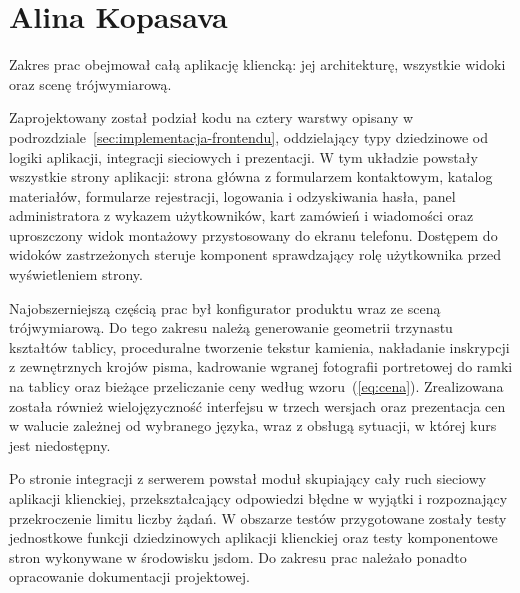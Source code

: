 \section{Alina Kopasava}
\label{sec:wklad-kopasava}

Zakres prac obejmował całą aplikację kliencką: jej architekturę, wszystkie widoki oraz scenę trójwymiarową.

Zaprojektowany został podział kodu na cztery warstwy opisany w podrozdziale~\ref{sec:implementacja-frontendu}, oddzielający typy dziedzinowe od logiki aplikacji, integracji sieciowych i prezentacji. W tym układzie powstały wszystkie strony aplikacji: strona główna z formularzem kontaktowym, katalog materiałów, formularze rejestracji, logowania i odzyskiwania hasła, panel administratora z wykazem użytkowników, kart zamówień i wiadomości oraz uproszczony widok montażowy przystosowany do ekranu telefonu. Dostępem do widoków zastrzeżonych steruje komponent sprawdzający rolę użytkownika przed wyświetleniem strony.

Najobszerniejszą częścią prac był konfigurator produktu wraz ze sceną trójwymiarową. Do tego zakresu należą generowanie geometrii trzynastu kształtów tablicy, proceduralne tworzenie tekstur kamienia, nakładanie inskrypcji z zewnętrznych krojów pisma, kadrowanie wgranej fotografii portretowej do ramki na tablicy oraz bieżące przeliczanie ceny według wzoru~(\ref{eq:cena}). Zrealizowana została również wielojęzyczność interfejsu w trzech wersjach oraz prezentacja cen w walucie zależnej od wybranego języka, wraz z obsługą sytuacji, w której kurs jest niedostępny.

Po stronie integracji z serwerem powstał moduł skupiający cały ruch sieciowy aplikacji klienckiej, przekształcający odpowiedzi błędne w wyjątki i rozpoznający przekroczenie limitu liczby żądań. W obszarze testów przygotowane zostały testy jednostkowe funkcji dziedzinowych aplikacji klienckiej oraz testy komponentowe stron wykonywane w środowisku jsdom. Do zakresu prac należało ponadto opracowanie dokumentacji projektowej.
